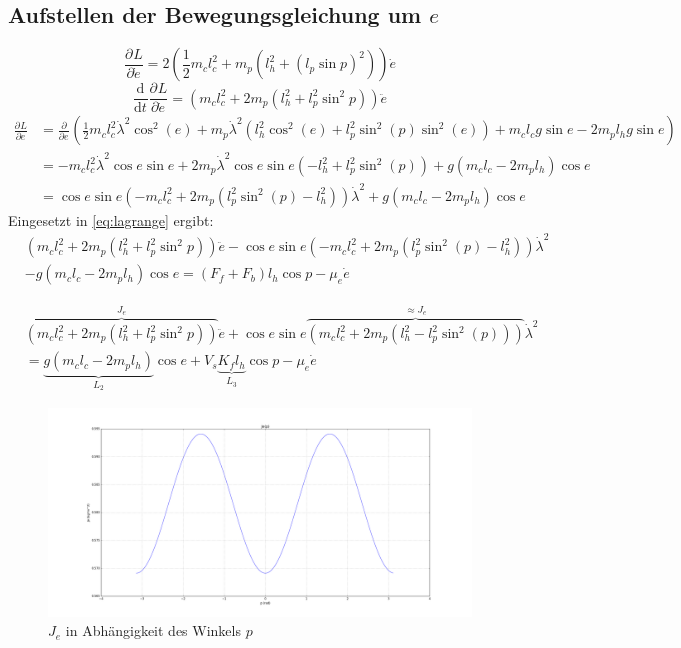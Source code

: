 \documentclass{article}
\newcommand{\partiell}[3][]{\frac{\partial^{#1}#2}{\partial{#3}^{#1}}}
\newcommand{\diff}[3][]{\frac{\mathrm{d}^{#1}#2}{\mathrm{d}{#3}^{#1}}}
\begin{document}
	\subsection{Aufstellen der Bewegungsgleichung um $e$}
	\begin{equation}
	\partiell{L}{\dot{e}} = 2(\frac{1}{2}m_cl_c^2
	+ m_p(l_h^2+(l_p\sin p)^2))\dot{e}
	\end{equation}
	\begin{equation}
	\diff{}{t}\partiell{L}{\dot{e}} = (m_cl_c^2
	+ 2 m_p(l_h^2+l_p^2\sin^2 p))\ddot{e}
	\end{equation}
	\begin{equation}
	\begin{split}
	\partiell{L}{e} &= \partiell{}{e}(\frac{1}{2} m_c l_c^2 \dot{\lambda}^2 \cos^2 (e) + m_p \dot{\lambda}^2 (l_h^2 \cos^2 (e) + l_p^2 \sin^2 (p) \sin^2 (e))
	+ m_c l_c g \sin e - 2 m_p l_h g \sin e)\\
	&= -m_c l_c^2 \dot{\lambda}^2 \cos e \sin e + 2 m_p \dot{\lambda}^2 \cos e \sin e (-l_h^2  + l_p^2 \sin^2 (p) ) + g(m_c l_c - 2 m_p l_h) \cos e\\
	&= \cos e \sin e  (-m_c l_c^2 + 2 m_p (l_p^2 \sin^2 (p) -l_h^2  )) \dot{\lambda}^2+ g(m_c l_c - 2 m_p l_h) \cos e
	\end{split}
	\end{equation}
	Eingesetzt in \eqref{eq:lagrange} ergibt:
	\begin{equation}
	\begin{split}
	&(m_cl_c^2+ 2 m_p(l_h^2+l_p^2\sin^2 p))\ddot{e} - \cos e \sin e (-m_c l_c^2 + 2 m_p (l_p^2 \sin^2 (p) -l_h^2  ))\dot{\lambda}^2 \\
	& - g(m_c l_c - 2 m_p l_h) \cos e = (F_f + F_b)l_h  \cos p - \mu_e \dot{e}
	\end{split}
	\end{equation}
	
	\begin{equation}
	\begin{split}
	&\overbrace{(m_cl_c^2+ 2 m_p(l_h^2+l_p^2\sin^2 p))}^{J_e}\ddot{e} + \cos e \sin e \overbrace{(m_c l_c^2 + 2 m_p ( l_h^2 -l_p^2 \sin^2 (p) ))}^{\approx J_e} \dot{\lambda}^2 \\
	&= \underbrace{g(m_c l_c - 2 m_p l_h)}_{L_2} \cos e + V_s \underbrace{ K_f l_h}_{L_3}  \cos p  - \mu_e \dot{e}
	\end{split}
	\end{equation}
	\begin{figure}[ht]
		\centering
		\includegraphics[width=1\textwidth]{images/J_e}
		\caption{$J_e$ in Abhängigkeit des Winkels $p$}
		\label{fig:J_e}
	\end{figure}
\end{document}

